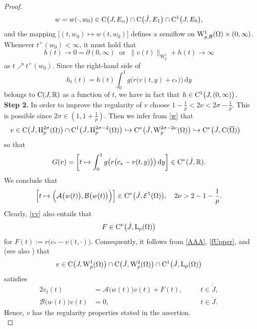 \documentclass[reqno,11pt]{amsart}
\numberwithin{equation}{section}
\newcommand{\R}{\mathbb{R}}
\newcommand{\rd}{\mathrm{d}}
\begin{document}
\begin{proof}
\begin{equation}\label{w}
w=w(\cdot,w_0)\in {\rm C}\big(J,E_\alpha\big) \cap {\rm C}\big(\dot
J, E_1\big)\cap {\rm C}^1\big(J, E_0\big),
\end{equation}
and the mapping $\bigl[(t,w_0)\mapsto w(t,w_0)\bigr]$ defines a
semiflow on ${\rm W}_{p,\mathcal{B}}^{1}(\Omega)\times
(0,\infty)$. Whenever $t^+(w_0)<\infty$, it must hold that
\begin{equation}\label{globalex}
h(t)\to 0=\partial (0,\infty)\ \text{ or }\
\|v(t)\|_{\operatorname{W}_p^1}+h(t)\to\infty
\end{equation}
as $t\nearrow t^+(w_0)$. Since the right-hand side of
$$
h_t(t)=h(t)\int_0^1 g\big( r\bigl( v(t,y)+c_*\bigr)\big)\,\rd y
$$
belongs to ${\rm C}(J,\R)$ as a function of $t$, we have
in fact that $h\in {\rm C}^1\bigl( J,(0,\infty)\bigr)$.\\

{\bf Step 2.} In order to improve the regularity of $v$ choose
$1-\frac{1}{p}<2\nu<2\sigma-\frac{1}{p}$. This is possible since
$2\sigma\in (1,1+\frac{1}{p})$. Then we infer from \eqref{w} that
\begin{align}
v\in {\rm C}\big(\dot J,\operatorname{H}_p^{2\sigma}(\Omega)\big)
\cap{\rm C}^1\big(\dot J,\operatorname{H}_p^{2\sigma-2}(\Omega)\big)
  &\hookrightarrow  {\rm C}^\nu\big(\dot J,
\operatorname{W} _p^{2\sigma-2\nu}(\Omega)\big)\hookrightarrow
{\rm C} ^\nu\big(\dot J,{\rm C}(\overline{\Omega})\big)\label{vv}
\end{align}
so that
$$
G(v)=\left[ t\mapsto\int_0^1 g\big( r\bigl( c_*-v(t,y)
  \bigr)\big)\,\rd y\right]\in {\rm C}^\nu(\dot J,\R).
$$
We conclude that
\begin{equation}\label{AAA}
\Big[ t\mapsto \Big( \mathcal{A}\bigl( w(t) \bigr),\mathcal{B}\bigl(
w(t) \bigr)\Big)\Big]\in{\rm C}^{\nu}\big(\dot
J,\mathcal{E}^1(\Omega)\big),\quad 2\nu>2-1-\frac{1}{p}.
\end{equation}
Clearly, \eqref{vv} also entails that 
\begin{equation}\label{fUpper}
F\in {\rm C}^\nu\big(\dot J,{\rm L}_p(\Omega)\big)
\end{equation}
for  $F(t):=r\bigl( c_*-v(t,\cdot)\bigr)$. Consequently, it follows
from \eqref{AAA}, \eqref{fUpper}, and
\cite[Theorem~11.3]{Amann_Teubner} (see also
\cite[Theorem~13.3]{Amann_Teubner}) that
$$
v\in {\rm C}\big(J, \operatorname{W}_p^1(\Omega)\big) \cap
{\rm C}\big(\dot J, \operatorname{W} _p^2(\Omega)\big)\cap
{\rm C}^1\big(\dot J, {\rm L} _p(\Omega)\big) 
$$
satisfies
\begin{alignat*}{2}
v_t(t)&= \mathcal{A}\bigl( w(t)\bigr)v(t)+F(t), \quad && t\in \dot J,\\
\mathcal{B}\bigl( w(t)\bigr)v(t)&=0, && t\in \dot J.
\end{alignat*}
Hence, $v$ has the  regularity
properties stated in the assertion.\\ 


\end{proof}
\end{document}

